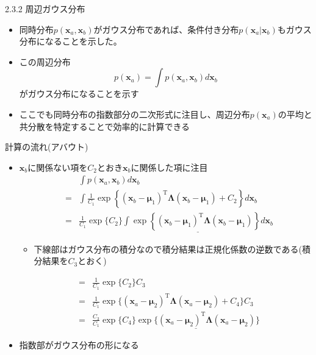 \begin{frame}{2.3.2 周辺ガウス分布}
 \begin{itemize}
  \item 同時分布$p(\bm{x}_a,\bm{x}_b)$がガウス分布であれば、条件付き分布$p(\bm{x}_a|\bm{x}_b)$もガウス分布になることを示した。
  \item この周辺分布
        \begin{equation}
         p(\bm{x}_a) = \int p(\bm{x}_a,\bm{x}_b)d\bm{x}_b
        \end{equation}
        がガウス分布になることを示す
  \item ここでも同時分布の指数部分の二次形式に注目し、周辺分布$p(\bm{x}_a)$の平均と共分散を特定することで効率的に計算できる
 \end{itemize}
\end{frame}


\begin{frame}{計算の流れ(アバウト)}
 \begin{itemize}
  \item $\bm{x}_b$に関係ない項を$C_2$とおき$\bm{x}_b$に関係した項に注目
        \begin{eqnarray*}
         && \int p(\bm{x}_a,\bm{x}_b)d\bm{x}_b \\
         &=& \int \frac{1}{C_1}\exp\left\{(\bm{x}_b-\bm{\mu}_1)^{\mathrm{T}}\bm{\Lambda}(\bm{x}_b-\bm{\mu}_1)+C_2\right\}d\bm{x}_b \\
         &=& \frac{1}{C_1}\exp\{C_2\}\underline{\int \exp\left\{(\bm{x}_b-\bm{\mu}_1)^{\mathrm{T}}\bm{\Lambda}(\bm{x}_b-\bm{\mu}_1)\right\}d\bm{x}_b}
        \end{eqnarray*}
        \begin{itemize}
         \item 下線部はガウス分布の積分なので積分結果は正規化係数の逆数である(積分結果を$C_3$とおく)
        \end{itemize}
        \begin{eqnarray*}
         &=&\frac{1}{C_1}\exp\{C_2\}C_3 \\
         &=&\frac{1}{C_1}\exp\{(\bm{x}_a-\bm{\mu}_2)^{\mathrm{T}}\bm{\Lambda} (\bm{x}_a-\bm{\mu}_2)+C_4\}C_3\\
         &=&\frac{C_3}{C_1}\exp\{C_4\}\underline{\exp\{(\bm{x}_a-\bm{\mu}_2)^{\mathrm{T}}\bm{\Lambda} (\bm{x}_a-\bm{\mu}_2)}\}
        \end{eqnarray*}
  \item 指数部がガウス分布の形になる
 \end{itemize}
\end{frame}


